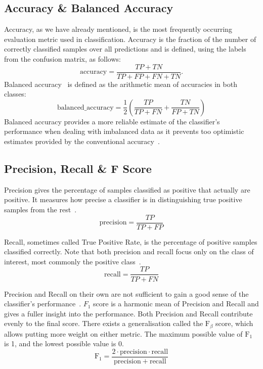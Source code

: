 \subsection{Accuracy \& Balanced Accuracy}
\label{subsection:accuracy}

Accuracy, as we have already mentioned, is the most frequently occurring evaluation metric used in
classification. Accuracy is the fraction of the number of correctly classified samples over all
predictions and is defined, using the labels from the confusion matrix, as follows:
\begin{equation}
    \mathrm{accuracy} = \frac{TP + TN}{TP + FP + FN + TN}.
\end{equation}
Balanced accuracy~\cite{baccuracy} is defined as the arithmetic mean of accuracies in both classes:
\begin{equation}
    \mathrm{balanced\_accuracy} = \frac{1}{2}\left(\frac{TP}{TP + FN} + \frac{TN}{FP + TN}\right)
\end{equation}
Balanced accuracy provides a more reliable estimate of the classifier's performance when dealing
with imbalanced data as it prevents too optimistic estimates provided by the conventional
accuracy~\cite{baccuracy}.


\subsection{Precision, Recall \& F Score}
\label{section:precision-recall-f1}

Precision gives the percentage of samples classified as positive that actually are positive. It
measures how precise a classifier is in distinguishing true positive samples from the
rest~\cite{gosain2017}.
\begin{equation}
    \mathrm{precision} = \frac{TP}{TP + FP}
\end{equation}

Recall, sometimes called True Positive Rate, is the percentage of positive samples classified
correctly. Note that both precision and recall focus only on the class of interest, most commonly
the positive class~\cite{bad-practices}.
\begin{equation}
    \mathrm{recall} = \frac{TP}{TP + FN}
\end{equation}

Precision and Recall on their own are not sufficient to gain a good sense of the classifier's
performance~\cite{learning-from-imb-data}. $F_1$ score is a harmonic mean of Precision and Recall
and gives a fuller insight into the performance. Both Precision and Recall contribute evenly to the
final score. There exists a generalisation called the $\mathrm{F}_\beta$ score, which allows
putting more weight on either metric. The maximum possible value of $\mathrm{F_1}$ is 1, and the
lowest possible value is 0.
\begin{equation}
    \mathrm{F_1} = \frac{2 \cdot \mathrm{precision} \cdot \mathrm{recall}}{\mathrm{precision} +
    \mathrm{recall}}
\end{equation}


